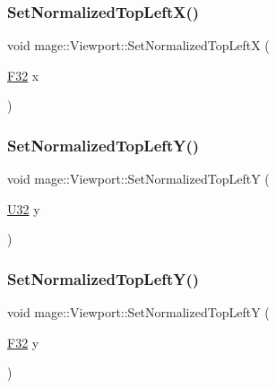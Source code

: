 \subsubsection{\texorpdfstring{Set\+Normalized\+Top\+Left\+X()}{SetNormalizedTopLeftX()}\hspace{0.1cm}{\footnotesize\ttfamily [2/2]}}
{\footnotesize\ttfamily void mage\+::\+Viewport\+::\+Set\+Normalized\+Top\+LeftX (\begin{DoxyParamCaption}\item[{\hyperlink{namespacemage_aa97e833b45f06d60a0a9c4fc22ae02c0}{F32}}]{x }\end{DoxyParamCaption})\hspace{0.3cm}{\ttfamily [noexcept]}}

\hypertarget{classmage_1_1_viewport_ab186a0208f26d2900d536c84d0292229}{}\label{classmage_1_1_viewport_ab186a0208f26d2900d536c84d0292229} 
\subsubsection{\texorpdfstring{Set\+Normalized\+Top\+Left\+Y()}{SetNormalizedTopLeftY()}\hspace{0.1cm}{\footnotesize\ttfamily [1/2]}}
{\footnotesize\ttfamily void mage\+::\+Viewport\+::\+Set\+Normalized\+Top\+LeftY (\begin{DoxyParamCaption}\item[{\hyperlink{namespacemage_a41c104c036fba3756a74e19f793eeaa1}{U32}}]{y }\end{DoxyParamCaption})\hspace{0.3cm}{\ttfamily [noexcept]}}

\hypertarget{classmage_1_1_viewport_a055de66fa911b8a017ad79a4b479187c}{}\label{classmage_1_1_viewport_a055de66fa911b8a017ad79a4b479187c} 
\subsubsection{\texorpdfstring{Set\+Normalized\+Top\+Left\+Y()}{SetNormalizedTopLeftY()}\hspace{0.1cm}{\footnotesize\ttfamily [2/2]}}
{\footnotesize\ttfamily void mage\+::\+Viewport\+::\+Set\+Normalized\+Top\+LeftY (\begin{DoxyParamCaption}\item[{\hyperlink{namespacemage_aa97e833b45f06d60a0a9c4fc22ae02c0}{F32}}]{y }\end{DoxyParamCaption})\hspace{0.3cm}{\ttfamily [noexcept]}}

